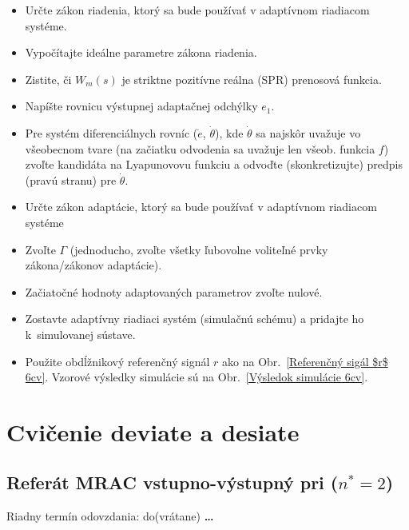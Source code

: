 ﻿\documentclass[a4paper, 10pt, ]{article}
\begin{document}
\begin{enumerate}
	\begin{itemize}
		\item Určte zákon riadenia, ktorý sa bude používať v adaptívnom riadiacom systéme.
		\item Vypočítajte ideálne parametre zákona riadenia.
		\item Zistite, či $W_m(s)$ je striktne pozitívne reálna (SPR) prenosová funkcia.
		\item Napíšte rovnicu výstupnej adaptačnej odchýlky $e_1$.
		\item Pre systém diferenciálnych rovníc ($\dot e$, $\dot \theta$), kde $\dot \theta$ sa najskôr uvažuje vo všeobecnom tvare (na začiatku odvodenia sa uvažuje len všeob. funkcia $f$) zvoľte kandidáta na Lyapunovovu funkciu a odvoďte (skonkretizujte) predpis (pravú stranu) pre $\dot \theta$.
		\item Určte zákon adaptácie, ktorý sa bude používať v adaptívnom riadiacom systéme
		\item Zvoľte $\Gamma$ (jednoducho, zvoľte všetky ľubovolne voliteľné prvky zákona/zákonov adaptácie).
		\item Začiatočné hodnoty adaptovaných parametrov zvoľte nulové.
		\item Zostavte adaptívny riadiaci systém (simulačnú schému) a pridajte ho k~simulovanej sústave.
		\item Použite obdĺžnikový referenčný signál $r$ ako na Obr.~\ref{Referenčný sigál $r$ 6cv}. Vzorové výsledky simulácie sú na Obr.~\ref{Výsledok simulácie 6cv}.
	\end{itemize}

\end{enumerate}















\section{Cvičenie deviate a desiate}
\label{cvic910}


\subsection{Referát MRAC vstupno-výstupný pri ($n^* = 2$)}


\noindent
Riadny termín odovzdania: do(vrátane) \textbf{\color{red}\ldots} %
\end{document}
